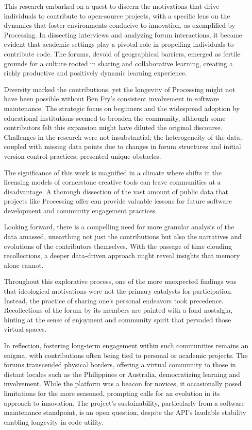 
This research embarked on a quest to discern the motivations that drive individuals to contribute to open-source projects, with a specific lens on the dynamics that foster environments conducive to innovation, as exemplified by Processing. In dissecting interviews and analyzing forum interactions, it became evident that academic settings play a pivotal role in propelling individuals to contribute code. The forums, devoid of geographical barriers, emerged as fertile grounds for a culture rooted in sharing and collaborative learning, creating a richly productive and positively dynamic learning experience.

Diversity marked the contributions, yet the longevity of Processing might not have been possible without Ben Fry's consistent involvement in software maintenance. The strategic focus on beginners and the widespread adoption by educational institutions seemed to broaden the community, although some contributors felt this expansion might have diluted the original discourse. Challenges in the research were not insubstantial; the heterogeneity of the data, coupled with missing data points due to changes in forum structures and initial version control practices, presented unique obstacles.

The significance of this work is magnified in a climate where shifts in the licensing models of cornerstone creative tools can leave communities at a disadvantage. A thorough dissection of the vast amount of public data that projects like Processing offer can provide valuable lessons for future software development and community engagement practices.

Looking forward, there is a compelling need for more granular analysis of the data amassed, unearthing not just the contributions but also the narratives and evolutions of the contributors themselves. With the passage of time clouding recollections, a deeper data-driven approach might reveal insights that memory alone cannot.

Throughout this explorative process, one of the more unexpected findings was that ideological motivations were not the primary catalysts for participation. Instead, the practice of sharing one's personal endeavors took precedence. Recollections of the forum by its members are painted with a fond nostalgia, hinting at the sense of enjoyment and community spirit that pervaded those virtual spaces.

In reflection, fostering long-term engagement within such communities remains an enigma, with contributions often being tied to personal or academic projects. The forums transcended physical borders, offering a virtual community to those in distant locales such as the Philippines or Australia, democratizing learning and involvement. While the platform was a beacon for novices, it occasionally posed limitations for the more seasoned, prompting calls for an evolution in its approach to innovation. The project’s sustainability, particularly from a software maintenance standpoint, is an open question, despite the API’s laudable stability enabling longevity in code utility.

